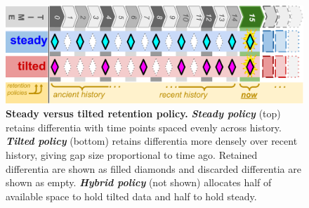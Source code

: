 \begin{figure}
  \centering
  \includegraphics[width=\linewidth]{img/steady-vs-tilted-schematic}
  \caption{%
  \textbf{Steady versus tilted retention policy.}
  \footnotesize
  \textbf{\textit{Steady policy}} (top) retains differentia with time points spaced evenly across history.
  \textbf{\textit{Tilted policy}} (bottom) retains differentia more densely over recent history, giving gap size proportional to time ago.
  Retained differentia are shown as filled diamonds and discarded differentia are shown as empty.
  \textbf{\textit{Hybrid policy}} (not shown) allocates half of available space to hold tilted data and half to hold steady.
  }
  \label{fig:steady-vs-tilted-schematic}
\end{figure}
